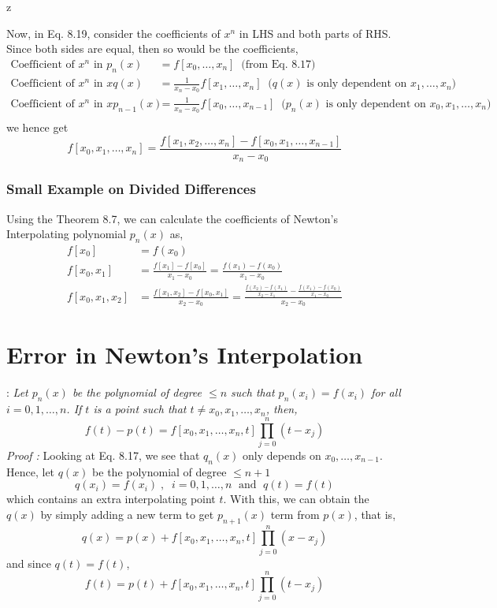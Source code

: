 z\documentclass[a4paper,12pt,twoside]{book}
\newcommand{\nll}[0]{\newline\newline}
\newcommand{\tit}[1]{\textit{#1}}
\newcommand{\theor}[1]{\boxed{\textbf{\textit{Theorem \thechapter.#1}}}}
\begin{document}
\nll
Now, in Eq. 8.19, consider the coefficients of $x^n$ in LHS and both parts of RHS. Since both sides are equal, then so would be the coefficients,
\begin{equation}
    \begin{split}
        \text{Coefficient of $x^n$ in $p_n(x)$} &= f[x_0,\dots, x_n] \;\;\text{(from Eq. 8.17)}\\
        \text{Coefficient of $x^n$ in $xq(x)$} &= \frac{1}{x_n-x_0} f[x_1,\dots,x_n]\;\;\text{($q(x)$ is only dependent on $x_1,\dots,x_n$)}\\
        \text{Coefficient of $x^n$ in $xp_{n-1}(x)$} &= \frac{1}{x_n-x_0}f[x_0,\dots, x_{n-1}] \;\;\text{($p_n(x)$ is only dependent on $x_0,x_1,\dots,x_n$)}\\
    \end{split}
\end{equation}
we hence get
\[ f[x_0,x_1,\dots,x_n] = \frac{f[x_1,x_2,\dots,x_n] - f[x_0,x_1,\dots,x_{n-1}]}{x_n-x_0} \]
\nll
\subsubsection{Small Example on Divided Differences}
Using the Theorem 8.7, we can calculate the coefficients of Newton's Interpolating polynomial $p_n(x)$ as,
\begin{equation}
    \begin{split}
        f[x_0] &= f(x_0)\\
        f[x_0,x_1] &= \frac{f[x_1] - f[x_0]}{x_1-x_0} = \frac{f(x_1) - f(x_0)}{x_1 - x_0}\\
        f[x_0,x_1,x_2] &= \frac{f[x_1,x_2] - f[x_0,x_1]}{x_2 -x_0} = \frac{\frac{f(x_2) - f(x_1)}{x_2-x_1} - \frac{f(x_1) - f(x_0)}{x_1 -x_0}}{x_2-x_0}
    \end{split}
\end{equation}
\section{Error in Newton's Interpolation}
\theor{8} : \tit{Let $p_n(x)$ be the polynomial of degree $\le n$ such that $p_n(x_i) = f(x_i)$ for all $i=0,1,\dots,n$. If $t$ is a point such that $t\neq x_0,x_1,\dots,x_n$, then,
\begin{equation}
    f(t) - p(t) = f[x_0,x_1,\dots,x_n,t] \prod_{j=0}^n (t-x_j)
\end{equation}}
\tit{Proof : } Looking at Eq. 8.17, we see that $q_n(x)$ only depends on $x_0,\dots,x_{n-1}$. Hence, let $q(x)$ be the polynomial of degree $\le n+1$
\[q(x_i) = f(x_i)\;,\;\;i=0,1,\dots,n\;\text{ and }\;q(t) = f(t)\]
which contains an extra interpolating point $t$. With this, we can obtain the $q(x)$ by simply adding a new term to get $p_{n+1}(x)$ term from $p(x)$, that is,
\[ q(x) = p(x) + f[x_0,x_1,\dots,x_n,t] \prod_{j=0}^n (x-x_j)\]
and since $q(t) = f(t)$,
\[  f(t) = p(t) + f[x_0,x_1,\dots,x_n,t] \prod_{j=0}^n (t-x_j) \]
\end{document}
